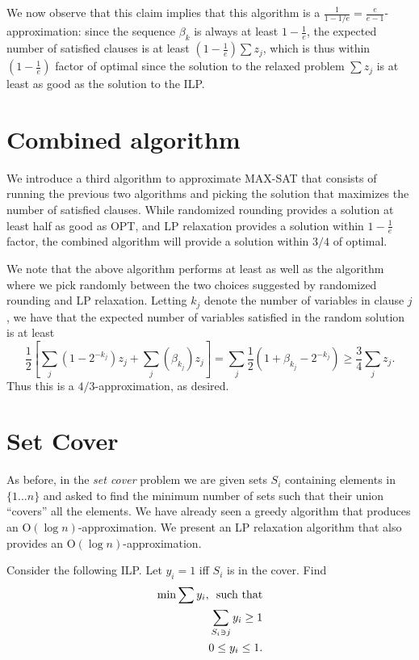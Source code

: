 \documentclass{article}
\begin{document}
We now observe that this claim implies that this algorithm is a $\frac{1}{1-1/e}=\frac{e}{e-1}$-approximation: since the sequence $\beta_k$ is always at least $1-\frac{1}{e}$, the expected number of satisfied clauses is at least $(1-\frac{1}{e})\sum z_j$, which is thus within $(1-\frac{1}{e})$ factor of optimal since the solution to the relaxed problem $\sum z_j$ is at least as good as the solution to the ILP.

\section{Combined algorithm}
We introduce a third algorithm to approximate MAX-SAT that consists of running the previous two algorithms and picking the solution that maximizes the number of satisfied clauses.  While randomized rounding provides a solution at least half as good as OPT, and LP relaxation provides a solution within $1-\frac{1}{e}$ factor, the combined algorithm will provide a solution within $3/4$ of optimal.

We note that the above algorithm performs at least as well as the algorithm where we pick randomly between the two choices suggested by randomized rounding and LP relaxation.  Letting $k_j$ denote the number of variables in clause $j$, we have that the expected number of variables satisfied in the random solution is at least $$\frac{1}{2}\left[\sum_j(1-2^{-k_j})z_j+\sum_j(\beta_{k_j})z_j\right]=\sum_j \frac{1}{2}(1+\beta_{k_j}-2^{-k_j})\geq \frac{3}{4}\sum_j z_j.$$
Thus this is a $4/3$-approximation, as desired.

\section{Set Cover}
As before, in the \emph{set cover} problem we are given sets $S_i$ containing elements in $\{1...n\}$ and asked to find the minimum number of sets such that their union ``covers'' all the elements.  We have already seen a greedy algorithm that produces an $\textrm{O}(\log n)$-approximation.  We present an LP relaxation algorithm that also provides an $\textrm{O}(\log n)$-approximation.

Consider the following ILP.  Let $y_i=1$ iff $S_i$ is in the cover.  Find
\begin{align}
\min\sum{y_i}, \textrm{\enspace such that}\\
\sum_{S_i\ni j}y_i\geq 1\\
0\leq y_i\leq 1.
\end{align}
\end{document}
